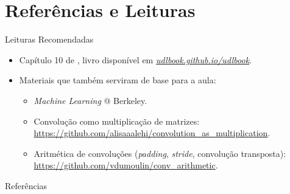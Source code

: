 \documentclass[aspectratio=169,xcolor=dvipsnames]{beamer}
\begin{document}
\section*{Referências e Leituras}

\begin{frame}{Leituras Recomendadas}
\leiturasize
\sloppy
\begin{itemize}
    \item Capítulo 10 de , livro disponível em \href{https://udlbook.github.io/udlbook/}{\textit{udlbook.github.io/udlbook}}.
    \item Materiais que também serviram de base para a aula:
    \begin{itemize}
        \item \textit{Machine Learning} @ Berkeley.
        \item Convolução como multiplicação de matrizes: \url{https://github.com/alisaaalehi/convolution_as_multiplication}.
        \item Aritmética de convoluções (\textit{padding}, \textit{stride}, convolução transposta): \url{https://github.com/vdumoulin/conv_arithmetic}.
    \end{itemize}
\end{itemize}
\end{frame}

\begin{frame}[allowframebreaks]{Referências}
\sloppy
\printbibliography[heading=none]
\end{frame}
\end{document}
